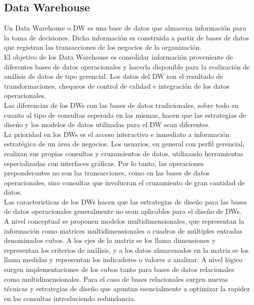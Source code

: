 \documentclass[DIV=calc, paper=a4, fontsize=11pt, twocolumn]{scrartcl}	 %
\begin{document}
\subsection*{Data Warehouse}
Un Data Warehouse o DW es una base de datos que almacena informaci\'{o}n para la toma de decisiones. Dicha informaci\'{o}n es construida
a partir de bases de datos que registran las transacciones de los negocios de la organizaci\'{o}n.\\
El objetivo de los Data Warehouse es consolidar informaci\'{o}n proveniente de diferentes bases de datos operacionales
y hacerla disponible para la realizaci\'{o}n de an\'{a}lisis de datos de tipo gerencial. Los datos del DW son el resultado de 
transformaciones, chequeos de control de calidad e integraci\'{o}n de los datos operacionales.\\
Las diferencias de los DWs con las bases de datos tradicionales, sobre todo en cuanto al tipo de consultas esperada en las mismas, 
hacen que las estrategias de dise\'{n}o y los modelos de datos utilizadas para el DW sean diferentes.\\
La prioridad en los DWs es el acceso interactivo e inmediato a informaci\'{o}n estrat\'{e}gica de un \'{a}rea de negocios. Los usuarios, 
en general con perfil gerencial, realizan sus propias consultas y cruzamientos de datos, utilizando herramientas especializadas 
con interfaces gr\'{a}ficas. Por lo tanto, las operaciones preponderantes no son las transacciones, como en las bases de datos operacionales, 
sino consultas que involucran el cruzamiento de gran cantidad de datos.\\
Las caracter\'{i}sticas de los DWs hacen que las estrategias de dise\~{n}o para las bases de datos operacionales generalmente no 
sean aplicables para el dise\~{n}o de DWs.\\
A nivel conceptual se proponen modelos multidimensionales, que representan la informaci\'{o}n como matrices multidimensionales 
o cuadros de m\'{u}ltiples entradas denominados cubos. A los ejes de la matriz se los llama dimensiones y representan los criterios 
de an\'{a}lisis, y a los datos almacenados en la matriz se los llama medidas y representan los indicadores o valores a analizar. 
A nivel l\'{o}gico surgen implementaciones de los cubos tanto para bases de datos relacionales como multidimensionales. Para el caso 
de bases relacionales surgen nuevas t\'{e}cnicas y estrategias de dise\~{n}o que apuntan esencialmente a optimizar la rapidez en las 
consultas introduciendo redundancia.\\
\end{document}
